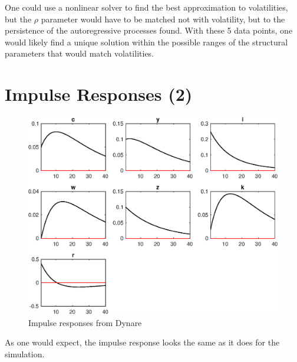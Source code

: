 \documentclass[11pt]{amsart}
\begin{document}
One could use a nonlinear solver to find the best approximation to volatilities, but the $\rho$ parameter would have to be matched not with volatility, but to the persistence of the autoregressive processes found. With these 5 data points, one would likely find a unique solution within the possible ranges of the structural parameters that would match volatilities.

\section{Impulse Responses (2)}

\begin{figure}[]
	\centering
	\includegraphics[width=1\textwidth]{Minki/Minki_dynare_IRF_epsilon.eps}
	\caption{Impulse responses from Dynare}
\end{figure}

As one would expect, the impulse response looks the same as it does for the simulation.
\end{document}
